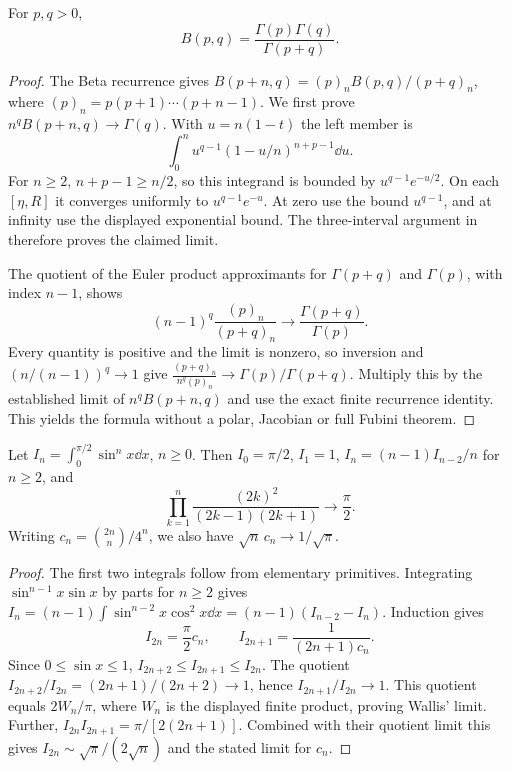 \begin{theorem}
For $p,q>0$,
\[
 B(p,q)=\frac{\Gamma(p)\Gamma(q)}{\Gamma(p+q)}.
\]
\end{theorem}
\begin{proof}
The Beta recurrence gives
$B(p+n,q)=(p)_n B(p,q)/(p+q)_n$, where
$(p)_n=p(p+1)\cdots(p+n-1)$.
We first prove $n^qB(p+n,q)\to\Gamma(q)$.
With $u=n(1-t)$ the left member is
\[
 \int_0^n u^{q-1}(1-u/n)^{n+p-1}\dd u.
\]
For $n\geq2$, $n+p-1\geq n/2$, so this integrand is bounded by
$u^{q-1}e^{-u/2}$. On each $[\eta,R]$ it converges uniformly to
$u^{q-1}e^{-u}$. At zero use the bound $u^{q-1}$, and at infinity use
the displayed exponential bound. The three-interval argument in
 therefore proves the claimed limit.

The quotient of the Euler product approximants for $\Gamma(p+q)$ and
$\Gamma(p)$, with index $n-1$, shows
\[
 (n-1)^q\frac{(p)_n}{(p+q)_n}\longrightarrow
 \frac{\Gamma(p+q)}{\Gamma(p)}.
\]
Every quantity is positive and the limit is nonzero, so inversion and
$(n/(n-1))^q\to1$ give
$\frac{(p+q)_n}{n^q(p)_n}\to\Gamma(p)/\Gamma(p+q)$.
Multiply this by the established limit of $n^qB(p+n,q)$ and use the exact
finite recurrence identity. This yields the formula without a polar,
Jacobian or full Fubini theorem.
\end{proof}

\begin{theorem}
Let $I_n=\int_0^{\pi/2}\sin^n x\dd x$, $n\geq0$. Then $I_0=\pi/2$,
$I_1=1$, $I_n=(n-1)I_{n-2}/n$ for $n\geq2$, and
\[
 \prod_{k=1}^n\frac{(2k)^2}{(2k-1)(2k+1)}\longrightarrow\frac\pi2.
\]
Writing $c_n=\binom{2n}{n}/4^n$, we also have
$\sqrt n\,c_n\to1/\sqrt\pi$.
\end{theorem}
\begin{proof}
The first two integrals follow from elementary primitives. Integrating
$\sin^{n-1}x\sin x$ by parts for $n\geq2$ gives
$I_n=(n-1)\int\sin^{n-2}x\cos^2x\dd x=(n-1)(I_{n-2}-I_n)$.
Induction gives
\[
 I_{2n}=\frac\pi2c_n,\qquad I_{2n+1}=\frac1{(2n+1)c_n}.
\]
Since $0\leq\sin x\leq1$,
$I_{2n+2}\leq I_{2n+1}\leq I_{2n}$.
The quotient $I_{2n+2}/I_{2n}=(2n+1)/(2n+2)\to1$, hence
$I_{2n+1}/I_{2n}\to1$. This quotient equals $2W_n/\pi$, where $W_n$
is the displayed finite product, proving Wallis' limit. Further,
$I_{2n}I_{2n+1}=\pi/[2(2n+1)]$. Combined with their quotient limit this
gives $I_{2n}\sim\sqrt\pi/(2\sqrt n)$ and the stated limit for $c_n$.
\end{proof}

